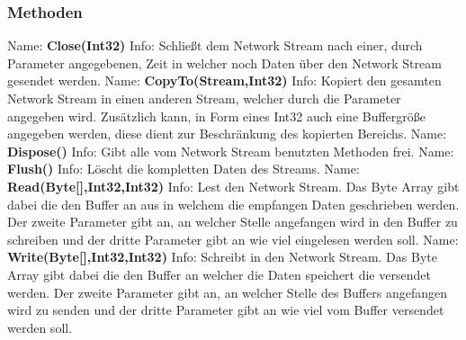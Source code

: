 \subsubsection{Methoden}
Name: \textbf{Close(Int32)}
\newline
Info: Schließt dem Network Stream nach einer, durch Parameter angegebenen, Zeit in welcher noch Daten über den Network Stream gesendet werden.
\newline \newline
Name: \textbf{CopyTo(Stream,Int32)}
\newline
Info: Kopiert den gesamten Network Stream in einen anderen Stream, welcher durch die Parameter angegeben wird. Zusätzlich kann, in Form eines Int32 auch eine Buffergröße angegeben werden, diese dient zur Beschränkung des kopierten Bereichs.
\newline \newline
Name: \textbf{Dispose()}
\newline
Info: Gibt alle vom Network Stream benutzten Methoden frei.
\newline \newline
Name: \textbf{Flush()}
\newline
Info: Löscht die kompletten Daten des Streams.
\newline \newline
Name: \textbf{Read(Byte[],Int32,Int32)}
\newline
Info: Lest den Network Stream. Das Byte Array gibt dabei die den Buffer an aus in welchem die empfangen Daten geschrieben werden. Der zweite Parameter gibt an, an welcher Stelle angefangen wird in den Buffer zu schreiben und der dritte Parameter gibt an wie viel eingelesen werden soll.
\newline \newline
Name: \textbf{Write(Byte[],Int32,Int32)}
\newline
Info: Schreibt in den Network Stream. Das Byte Array gibt dabei die den Buffer an welcher die Daten speichert die versendet werden. Der zweite Parameter gibt an, an welcher Stelle des Buffers angefangen wird zu senden und der dritte Parameter gibt an wie viel vom Buffer versendet werden soll.
\newline \newline